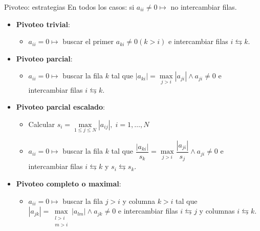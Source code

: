 \documentclass[9pt, aspectratio=169]{beamer}
\begin{document}
\begin{frame}{Pivoteo: estrategias}
En todos los casos: si $a_{ii} \ne 0 \mapsto$ no intercambiar filas. \medskip

 \begin{itemize}
  \item \textbf{Pivoteo trivial}: 
  \begin{itemize}
   \item $a_{ii} = 0 \mapsto$ buscar el primer $a_{ki} \ne 0 (k > i)$ e intercambiar filas $i \leftrightarrows k$.
  \end{itemize} \medskip \pause

  \item \textbf{Pivoteo parcial}: 
  \begin{itemize}
   \item $a_{ii} = 0 \mapsto$ buscar la fila $k$ tal que $|a_{ki}| = \max \limits_{j > i} |a_{ji}| \wedge a_{ji} \ne 0$ e intercambiar filas $i  \leftrightarrows k$.
  \end{itemize}  \medskip \pause

  \item \textbf{Pivoteo parcial escalado}:
  \begin{itemize}
   \item Calcular $s_i = \max \limits_{1 \leq j \leq N} |a_{ij}|, \; i=1,\ldots,N$
   \item $a_{ii} = 0 \mapsto$ buscar la fila $k$ tal que $\dfrac{|a_{ki}|}{s_k} = \max \limits_{j > i} \dfrac{|a_{ji}|}{s_j} \wedge a_{ji} \ne 0$ e intercambiar filas $i \leftrightarrows k$ y $s_i \leftrightarrows s_k$.
  \end{itemize} \medskip \pause

  \item \textbf{Pivoteo completo o maximal}:
  \begin{itemize}
   \item $a_{ii} = 0 \mapsto$ buscar la fila $j>i$ y columna $k>i$ tal que $|a_{jk}| = \max \limits_{\substack{l > i \\ m > i}} |a_{lm}| \wedge a_{jk} \ne 0$ e intercambiar filas $i \leftrightarrows j$ y columnas $i \leftrightarrows k$.
  \end{itemize}
 \end{itemize} \pause
\begin{center}
                                                                        \end{center}
\end{frame}
\end{document}
